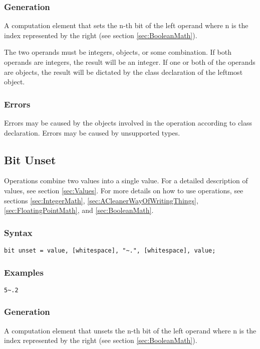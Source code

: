 \documentclass[10pt,a4paper]{article}
\begin{document}
\subsubsection{Generation}
A computation element that sets the n-th bit of the left operand where n is the index represented by the right (see section \ref{sec:BooleanMath}).

The two operands must be integers, objects, or some combination. If both operands are integers, the result will be an integer. If one or both of the operands are objects, the result will be dictated by the class declaration of the leftmost object.

\subsubsection{Errors}
Errors may be caused by the objects involved in the operation according to class declaration. Errors may be caused by unsupported types.

\newpage




\subsection{Bit Unset}
Operations combine two values into a single value. For a detailed description of values, see section \ref{sec:Values}. For more details on how to use operations, see sections \ref{sec:IntegerMath}, \ref{sec:ACleanerWayOfWritingThings}, \ref{sec:FloatingPointMath}, and \ref{sec:BooleanMath}.

\subsubsection{Syntax}
\begin{verbatim}
bit unset = value, [whitespace], "~.", [whitespace], value;
\end{verbatim}

\subsubsection{Examples}
\begin{verbatim}
5~.2
\end{verbatim}

\subsubsection{Generation}
A computation element that unsets the n-th bit of the left operand where n is the index represented by the right (see section \ref{sec:BooleanMath}).
\end{document}
